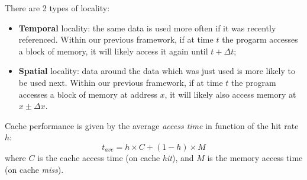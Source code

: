 \documentclass[a4paper,11pt]{article}
\begin{document}
There are 2 types of locality:
\begin{itemize}
	\item \textbf{Temporal} locality: the same data is used more often if it was recently referenced. Within our previous framework, if at time $t$ the progarm accesses a block of memory, it will likely access it again until $t + \Delta t$;
	\item \textbf{Spatial} locality: data around the data which was just used is more likely to be used next. Within our previous framework, if at time $t$ the program accesses a block of memory at address $x$, it will likely also access memory at $x \pm \Delta x$.
\end{itemize}

Cache performance is given by the average \textit{access time} in function of the hit rate $h$:
$$
	t_{ave} = h \times C + (1 - h) \times M
$$
where $C$ is the cache access time (on cache \textit{hit}), and $M$ is the memory access time (on cache \textit{miss}).
\end{document}
